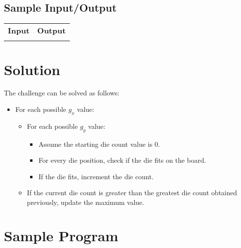 \documentclass[12pt]{report}
\begin{document}
	\subsection*{Sample Input/Output}
	\begin{tabular}{ |l|l| } 
		\hline
		\textbf{Input} & \textbf{Output} \\
		{} & {} \\ %
		\hline
	\end{tabular}


	\section*{Solution}
	The challenge can be solved as follows:
	\begin{itemize}
		\item For each possible $g_x$ value:
		\begin{itemize}
			\item For each possible $g_y$ value:
			\begin{itemize}
				\item Assume the starting die count value is 0.
				\item For every die position, check if the die fits on the board.
				\item If the die fits, increment the die count.
			\end{itemize}
			\item If the current die count is greater than the greatest die count obtained previously, update the maximum value.
		\end{itemize}
	\end{itemize}


	\section*{Sample Program}
	
	
\end{document}
